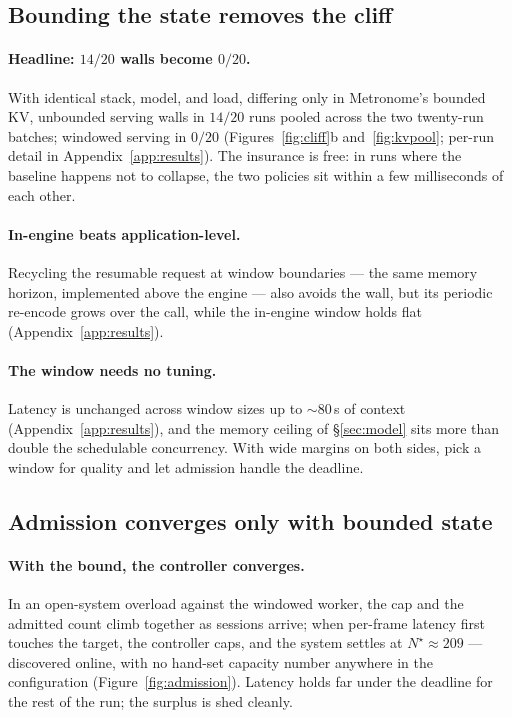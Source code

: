 \subsection{Bounding the state removes the cliff}
\label{sec:eval-cliff}

\paragraph{Headline: $14/20$ walls become $0/20$.} With identical stack, model, and load, differing
only in Metronome's bounded KV, unbounded serving walls in $14/20$ runs pooled across the two
twenty-run batches; windowed serving in $0/20$ (Figures~\ref{fig:cliff}b and~\ref{fig:kvpool};
per-run detail in Appendix~\ref{app:results}). The insurance is free: in runs where the baseline
happens not to collapse, the two policies sit within a few milliseconds of each other.

\paragraph{In-engine beats application-level.} Recycling the resumable request at window boundaries
--- the same memory horizon, implemented above the engine --- also avoids the wall, but its periodic
re-encode grows over the call, while the in-engine window holds flat (Appendix~\ref{app:results}).

\paragraph{The window needs no tuning.} Latency is unchanged across window sizes up to ${\sim}80$\,s
of context (Appendix~\ref{app:results}), and the memory ceiling of \S\ref{sec:model} sits more than
double the schedulable concurrency. With wide margins on both sides, pick a window for quality and
let admission handle the deadline.

\subsection{Admission converges only with bounded state}
\label{sec:eval-admission}

\paragraph{With the bound, the controller converges.} In an open-system overload against the windowed
worker, the cap and the admitted count climb together as sessions arrive; when per-frame latency
first touches the target, the controller caps, and the system settles at $N^\star{\approx}209$ ---
discovered online, with no hand-set capacity number anywhere in the configuration
(Figure~\ref{fig:admission}). Latency holds far under the deadline for the rest of the run; the
surplus is shed cleanly.

